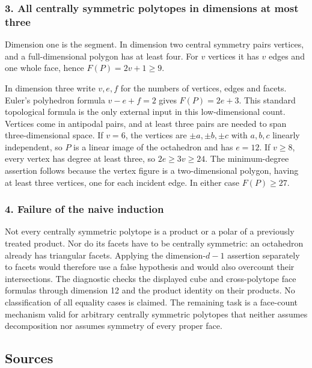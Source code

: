 \documentclass[11pt,a4paper]{article}
\begin{document}
\subsubsection{3. All centrally symmetric polytopes in dimensions at most three}
Dimension one is the segment. In dimension two central symmetry pairs vertices, and a full-dimensional polygon has at least four. For $v$ vertices it has $v$ edges and one whole face, hence $F(P)=2v+1\geq9$.

In dimension three write $v,e,f$ for the numbers of vertices, edges and facets. Euler's polyhedron formula $v-e+f=2$ gives $F(P)=2e+3$. This standard topological formula is the only external input in this low-dimensional count. Vertices come in antipodal pairs, and at least three pairs are needed to span three-dimensional space. If $v=6$, the vertices are $\pm a,\pm b,\pm c$ with $a,b,c$ linearly independent, so $P$ is a linear image of the octahedron and has $e=12$. If $v\geq8$, every vertex has degree at least three, so $2e\geq3v\geq24$. The minimum-degree assertion follows because the vertex figure is a two-dimensional polygon, having at least three vertices, one for each incident edge. In either case $F(P)\geq27$.

\subsubsection{4. Failure of the naive induction}
Not every centrally symmetric polytope is a product or a polar of a previously treated product. Nor do its facets have to be centrally symmetric: an octahedron already has triangular facets. Applying the dimension-$d-1$ assertion separately to facets would therefore use a false hypothesis and would also overcount their intersections. The diagnostic checks the displayed cube and cross-polytope face formulas through dimension 12 and the product identity on their products. No classification of all equality cases is claimed. The remaining task is a face-count mechanism valid for arbitrary centrally symmetric polytopes that neither assumes decomposition nor assumes symmetry of every proper face.

\subsection{Sources}
\end{document}

